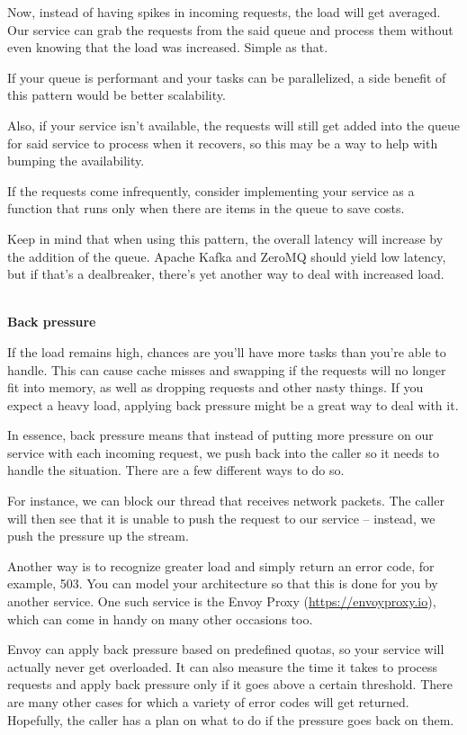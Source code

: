 Now, instead of having spikes in incoming requests, the load will get averaged. Our service can grab the requests from the said queue and process them without even knowing that the load was increased. Simple as that.

If your queue is performant and your tasks can be parallelized, a side benefit of this pattern would be better scalability.

Also, if your service isn't available, the requests will still get added into the queue for said service to process when it recovers, so this may be a way to help with bumping the availability.

If the requests come infrequently, consider implementing your service as a function that runs only when there are items in the queue to save costs.

Keep in mind that when using this pattern, the overall latency will increase by the addition of the queue. Apache Kafka and ZeroMQ should yield low latency, but if that's a dealbreaker, there's yet another way to deal with increased load.


\hspace*{\fill} \\ %
\noindent
\textbf{Back pressure}

If the load remains high, chances are you'll have more tasks than you're able to handle. This can cause cache misses and swapping if the requests will no longer fit into memory, as well as dropping requests and other nasty things. If you expect a heavy load, applying back pressure might be a great way to deal with it.

In essence, back pressure means that instead of putting more pressure on our service with each incoming request, we push back into the caller so it needs to handle the situation. There are a few different ways to do so.

For instance, we can block our thread that receives network packets. The caller will then see that it is unable to push the request to our service – instead, we push the pressure up the stream.

Another way is to recognize greater load and simply return an error code, for example, 503. You can model your architecture so that this is done for you by another service. One such service is the Envoy Proxy (\url{https://envoyproxy.io}), which can come in handy on many other occasions too.

Envoy can apply back pressure based on predefined quotas, so your service will actually never get overloaded. It can also measure the time it takes to process requests and apply back pressure only if it goes above a certain threshold. There are many other cases for which a variety of error codes will get returned. Hopefully, the caller has a plan on what to do if the pressure goes back on them.

